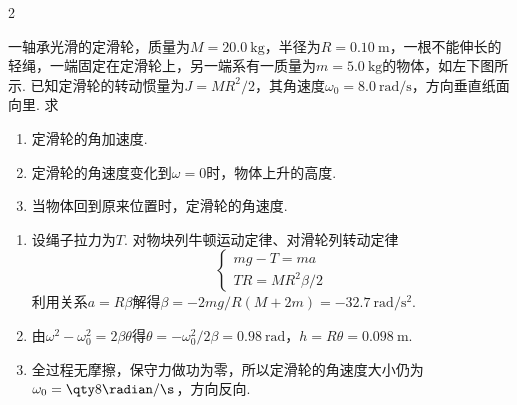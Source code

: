 \begin{paracol}{2}
\begin{problem}
    一轴承光滑的定滑轮，质量为$M=\qty{20.0}\kg$，半径为$R=\qty{0.10}\m$，一根不能伸长的轻绳，一端固定在定滑轮上，另一端系有一质量为$m=\qty{5.0}\kg$的物体，如左下图所示. 已知定滑轮的转动惯量为$J=MR^2/2$，其角速度$\omega_0=\qty{8.0}{\radian/\s}$，方向垂直纸面向里. 求
    \begin{enumerate}
        \item 定滑轮的角加速度.
        \item 定滑轮的角速度变化到$\omega=0$时，物体上升的高度.
        \item 当物体回到原来位置时，定滑轮的角速度.
    \end{enumerate}
    \switchcolumn\vspace*{\fill}\centering
    \vspace*{\fill}
\end{problem}
\end{paracol}
\begin{solution}\leavevmode
    \begin{enumerate}
        \item 设绳子拉力为$T$. 对物块列牛顿运动定律、对滑轮列转动定律
        \[\begin{cases}
            mg-T=ma\\
            TR=MR^2\beta/2
        \end{cases}\]
        利用关系$a=R\beta$解得$\beta=-2mg/R(M+2m)=\qty{-32.7}{\radian/\s^2}$.
        \item 由$\omega^2-\omega_0^2=2\beta\theta$得$\theta=-\omega_0^2/2\beta=\qty{0.98}\radian$，$h=R\theta=\qty{0.098}\m$.
        \item 全过程无摩擦，保守力做功为零，所以定滑轮的角速度大小仍为$\omega_0=\qty8{\radian/\s}$，方向反向.
    \end{enumerate}
\end{solution}


